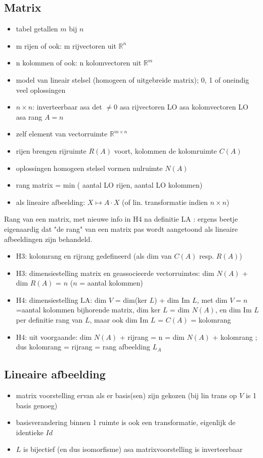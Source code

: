 \documentclass{article}
\begin{document}
\subsection{Matrix}

\begin{itemize}
    \item tabel getallen $m$ bij $n$
    \item m rijen of ook: m rijvectoren uit $\mathbb{R}^n$
    \item n kolommen of ook: n kolomvectoren uit $\mathbb{R}^m$
    \item model van lineair stelsel (homogeen of uitgebreide matrix); 0, 1 of oneindig veel oplossingen       
    \item $n \times n$: inverteerbaar asa det $\neq 0$ asa rijvectoren LO asa kolomvectoren LO asa rang $A=n$ 
    \item zelf element van vectorruimte  $\mathbb{R}^{m \times n}$ 
    \item rijen brengen rijruimte $R(A)$ voort, kolommen de kolomruimte $C(A)$ 
    \item oplossingen homogeen stelsel vormen nulruimte $N(A)$ 
    \item rang matrix = min ( aantal LO rijen, aantal LO kolommen) 
    \item als lineaire afbeelding: $X \mapsto A \cdot X$ (of lin. transformatie indien $n \times n$) 
\end{itemize}

Rang van een matrix, met nieuwe info in H4 na definitie LA : ergens beetje eigenaardig dat "de rang" van een matrix pas wordt aangetoond als lineaire afbeeldingen zijn behandeld. 
\begin{itemize}
    \item H3: kolomrang en rijrang gedefineerd (als dim van $C(A)$ resp. $R(A)$) 
    \item H3: dimensiestelling matrix en geassocieerde vectorruimtes: dim $N(A)$ + dim $R(A)$ = $n$ ($n$ = aantal kolommen) 
    \item H4: dimensiestelling LA: dim $V$ = dim(ker $L$) + dim Im $L$, met dim $V=n$=aantal kolommen bijhorende matrix, dim ker $L$ = dim $N(A)$, en dim Im $L$ per definitie rang van $L$, maar ook dim Im $L$ = $C(A)$ = kolomrang
    \item H4: uit voorgaande: dim $N(A)$ + rijrang = n = dim $N(A)$ + kolomrang ; dus kolomrang = rijrang = rang afbeelding $L_A$  
\end{itemize}

\subsection{Lineaire afbeelding}
\begin{itemize}
    \item matrix voorstelling ervan als er basis(sen) zijn gekozen (bij lin trans op $V$ is 1 basis genoeg)
    \item basisverandering binnen 1 ruimte is ook een transformatie, eigenlijk de identieke $Id$ 
    \item $L$ is bijectief (en dus isomorfisme) asa matrixvoorstelling is inverteerbaar     
    
\end{itemize}
\end{document}
